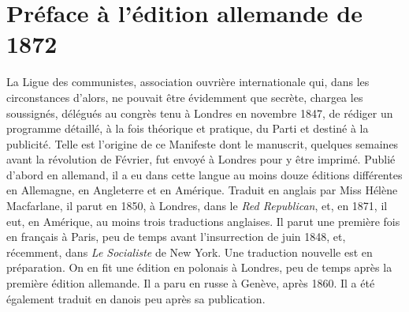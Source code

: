 \documentclass[french,twoside]{book} %
\begin{document}
\section[{Préface à l’édition allemande de 1872}]{Préface à l’édition allemande de 1872}
\noindent La Ligue des communistes, association ouvrière internationale qui, dans les circonstances d’alors, ne pouvait être évidemment que secrète, chargea les soussignés, délégués au congrès tenu à Londres en novembre 1847, de rédiger un programme détaillé, à la fois théorique et pratique, du Parti et destiné à la publicité. Telle est l’origine de ce Manifeste dont le manuscrit, quelques semaines avant la révolution de Février, fut envoyé à Londres pour y être imprimé. Publié d’abord en allemand, il a eu dans cette langue au moins douze éditions différentes en Allemagne, en Angleterre et en Amérique. Traduit en anglais par Miss Hélène Macfarlane, il parut en 1850, à Londres, dans le \emph{Red Republican}, et, en 1871, il eut, en Amérique, au moins trois traductions anglaises. Il parut une première fois en français à Paris, peu de temps avant l’insurrection de juin 1848, et, récemment, dans \emph{Le Socialiste} de New York. Une traduction nouvelle est en préparation. On en fit une édition en polonais à Londres, peu de temps après la première édition allemande. Il a paru en russe à Genève, après 1860. Il a été également traduit en danois peu après sa publication.\par
\end{document}
